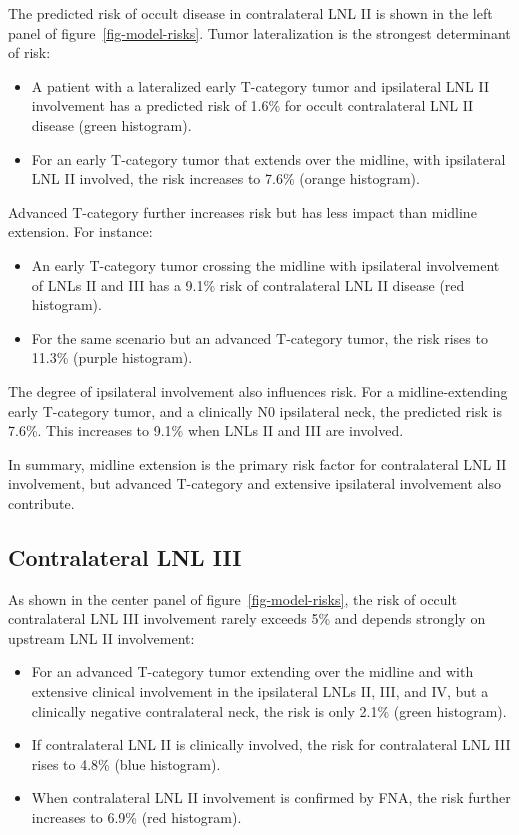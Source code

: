 \documentclass[
  sn-mathphys-num,
]{sn-jnl}
\providecommand{\tightlist}{%
  \setlength{\itemsep}{0pt}\setlength{\parskip}{0pt}}\usepackage{longtable,booktabs,array}
\begin{document}
The predicted risk of occult disease in contralateral LNL II is shown in
the left panel of figure~\ref{fig-model-risks}. Tumor lateralization is
the strongest determinant of risk:

\begin{itemize}
\tightlist
\item
  A patient with a lateralized early T-category tumor and ipsilateral
  LNL II involvement has a predicted risk of 1.6\% for occult
  contralateral LNL II disease (green histogram).\\
\item
  For an early T-category tumor that extends over the midline, with
  ipsilateral LNL II involved, the risk increases to 7.6\% (orange
  histogram).
\end{itemize}

Advanced T-category further increases risk but has less impact than
midline extension. For instance:

\begin{itemize}
\tightlist
\item
  An early T-category tumor crossing the midline with ipsilateral
  involvement of LNLs II and III has a 9.1\% risk of contralateral LNL
  II disease (red histogram).\\
\item
  For the same scenario but an advanced T-category tumor, the risk rises
  to 11.3\% (purple histogram).
\end{itemize}

The degree of ipsilateral involvement also influences risk. For a
midline-extending early T-category tumor, and a clinically N0
ipsilateral neck, the predicted risk is 7.6\%. This increases to 9.1\%
when LNLs II and III are involved.

In summary, midline extension is the primary risk factor for
contralateral LNL II involvement, but advanced T-category and extensive
ipsilateral involvement also contribute.

\subsection{Contralateral LNL III}\label{contralateral-lnl-iii}

As shown in the center panel of figure~\ref{fig-model-risks}, the risk
of occult contralateral LNL III involvement rarely exceeds 5\% and
depends strongly on upstream LNL II involvement:

\begin{itemize}
\tightlist
\item
  For an advanced T-category tumor extending over the midline and with
  extensive clinical involvement in the ipsilateral LNLs II, III, and
  IV, but a clinically negative contralateral neck, the risk is only
  2.1\% (green histogram).\\
\item
  If contralateral LNL II is clinically involved, the risk for
  contralateral LNL III rises to 4.8\% (blue histogram).\\
\item
  When contralateral LNL II involvement is confirmed by FNA, the risk
  further increases to 6.9\% (red histogram).
\end{itemize}
\end{document}

